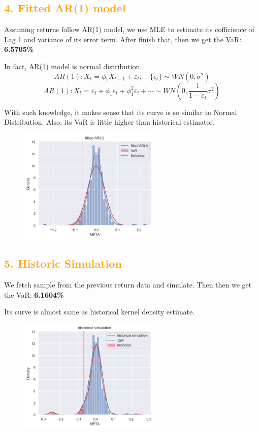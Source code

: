 \documentclass[11pt,en]{elegantpaper}
\begin{document}
\subsection*{\textcolor{orange}{4. Fitted AR(1) model}}

Assuming returns follow AR(1) model, we use MLE to estimate its cofficience of Lag 1 and variance of its error term. After finish that, then we get the VaR: \textbf{6.5705\%}

In fact, AR(1) model is normal distribution.
\[AR(1):X_t=\phi_1X_{t-1}+\varepsilon_t, \quad \{\epsilon_t\}\sim WN(0,\sigma^2)\]
\[AR(1):X_t=\varepsilon_t+\phi_1\varepsilon_t+\phi_1^2\varepsilon_t+\cdots \sim WN(0,\frac{1}{1-\varepsilon_t}\sigma^2)\]

With such knowledge, it makes sense that its curve is so similar to Normal Distribution. Also, its VaR is little higher than historical estimator.

\begin{figure}[htbp] 
    \centering 
    \includegraphics[width=0.6\textwidth]{./image/AR1.png} 
\end{figure}


\subsection*{\textcolor{orange}{{5. Historic Simulation}}}

 We fetch sample from the previous return data and simulate. Then then we get the VaR: \textbf{6.1604\%} 

Its curve is almost same as historical kernel density estimate.
\begin{figure}[htbp] 
    \centering 
    \includegraphics[width=0.6\textwidth]{./image/historic.png} 
\end{figure}
\end{document}
